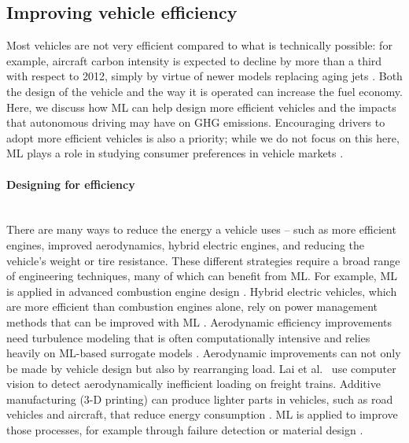 \documentclass[11pt]{report}
\newcommand{\et}{et al.~}
\newcommand{\Gap}{\texorpdfstring{\hfill}{}}
\begin{document}
\subsection{Improving vehicle efficiency}\label{sec:TEfficient}
Most vehicles are not very efficient compared to what is technically possible: for example, aircraft carbon intensity is expected to decline by more than a third with respect to 2012, simply by virtue of newer models replacing aging jets \cite{schaefer2015}. Both the design of the vehicle and the way it is operated can increase the fuel economy. Here, we discuss how ML can help design more efficient vehicles and the impacts that autonomous driving may have on GHG emissions. Encouraging drivers to adopt more efficient vehicles is also a priority; while we do not focus on this here, ML plays a role in studying consumer preferences in vehicle markets \cite{burnap2016improving}.

\paragraph*{Designing for efficiency}\Gap\mbox{}\\There are many ways to reduce the energy a vehicle uses -- such as more efficient engines, improved aerodynamics, hybrid electric engines, and reducing the vehicle's weight or tire resistance.
These different strategies require a broad range of engineering techniques, many of which can benefit from ML. For example, ML is applied in advanced combustion engine design \cite{JANAKIRAMAN2016304}.
Hybrid electric vehicles, which are more efficient than combustion engines alone, rely on power management methods that can be improved with ML \cite{en11030476}. Aerodynamic efficiency improvements need turbulence modeling that is often computationally intensive and relies heavily on ML-based surrogate models \cite{YONDO201823}. Aerodynamic improvements can not only be made by vehicle design but also by rearranging load. Lai \et\cite{doi:10.1243/09544097JRRT92} use computer vision to detect aerodynamically inefficient loading on freight trains.  
Additive manufacturing (3-D printing) can produce lighter parts in vehicles, such as road vehicles and aircraft, that reduce energy consumption \cite{kaack2018decarbonizing, Hertwich_2019}. ML is applied to improve those processes, for example through failure detection \cite{Scime2018114, Shevchik2018598} or material design \cite{Gu2018939}. 
\end{document}
